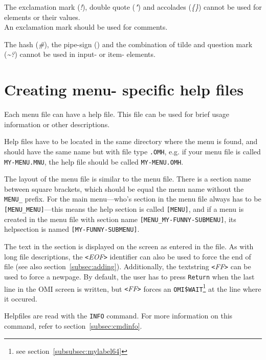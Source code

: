 \documentclass[a4paper]{book}
\newcommand{\vs}{\vspace{3mm}}
\newcommand{\lt}{\texttt{<}}
\newcommand{\gt}{\texttt{>}}
\begin{document}
\vs

The exclamation mark (\textsl{!}), double quote (\textsl{"}) and accolades (\textsl{{\{}{\}}}) cannot 
be used for elements or their values. \\
An exclamation mark should be used for comments.

\vs

The hash (\textsl{{\#}}), the pipe-sign (\textsl{\textbar}) and the combination of tilde and 
question mark (\textsl{\~{}?}) cannot be used in input- or item- elements.

\section{Creating menu- specific help files}\label{sec:mnhelp}

Each menu file can have a help file. This file can be used for brief usage information
or other descriptions.

Help files have to be located in the same directory where the menu is found, and should
have the same name but with file type \texttt{.OMH}, e.g. if your menu file is
called \texttt{MY-MENU.MNU}, the help file should be called \texttt{MY-MENU.OMH}.

\vs

The layout of the menu file is similar to the menu file. There is a section name
between square brackets, which should be equal the menu name without the \texttt{MENU\_} prefix.
For the main menu---who's section in the menu file always has to be \texttt{[MENU\_MENU]}---this
means the help section is called \texttt{[MENU]}, and if a menu is created in the menu file
with section name \texttt{[MENU\_MY-FUNNY-SUBMENU]}, its helpsection is named \texttt{[MY-FUNNY-SUBMENU]}.

\vs

The text in the section is displayed on the screen as entered in the file.
As with long file descriptions, the \textsl{\lt EOF\gt} identifier
can also be used to force the end of file (see also section~\ref{subsec:adding}).
Additionally, the textstring \textsl{\lt FF\gt} can be used to force
a newpage. By default, the user has to press \texttt{Return} when the last line
in the OMI screen is written, but \textsl{\lt FF\gt} forces an \texttt{OMI{\$}WAIT}\footnote{ see section~\ref{subsubsec:mylabel64}}
at the line where it occured.

\vs

Helpfiles are read with the \texttt{INFO} command. For
more information on this command, refer to section~\ref{subsec:cmdinfo}.
\end{document}
